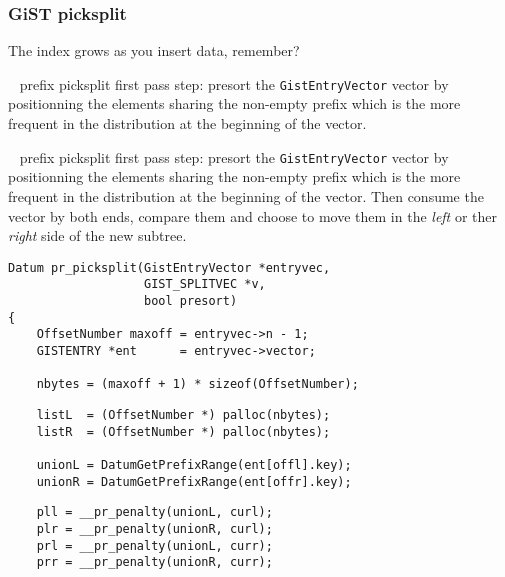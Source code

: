 \documentclass{beamer}
\begin{document}
\begin{frame}[fragile]
  \frametitle{GiST picksplit}

  The index grows as you insert data, remember?

  \begin{overprint}

  ~
  \linebreak
  prefix picksplit first pass step: presort the \texttt{GistEntryVector}
  vector by positionning the elements sharing the non-empty prefix which is
  the more frequent in the distribution at the beginning of the vector.
  \linebreak
  \linebreak

  ~
  \linebreak
  prefix picksplit first pass step: presort the \texttt{GistEntryVector}
  vector by positionning the elements sharing the non-empty prefix which is
  the more frequent in the distribution at the beginning of the vector.
  \linebreak
  \linebreak
  Then consume the vector by both ends, compare them and choose to move them
  in the \textit{left} or ther \textit{right} side of the new subtree.

  \begin{example}
  \begin{verbatim}
Datum pr_picksplit(GistEntryVector *entryvec,
                   GIST_SPLITVEC *v,
                   bool presort)
{
    OffsetNumber maxoff = entryvec->n - 1;
    GISTENTRY *ent      = entryvec->vector;

    nbytes = (maxoff + 1) * sizeof(OffsetNumber);
  \end{verbatim}
  \end{example}

  \begin{example}
  \begin{verbatim}
    listL  = (OffsetNumber *) palloc(nbytes);
    listR  = (OffsetNumber *) palloc(nbytes);

    unionL = DatumGetPrefixRange(ent[offl].key);
    unionR = DatumGetPrefixRange(ent[offr].key);
  \end{verbatim}
  \end{example}

  \begin{example}
  \begin{verbatim}
    pll = __pr_penalty(unionL, curl);
    plr = __pr_penalty(unionR, curl);
    prl = __pr_penalty(unionL, curr);
    prr = __pr_penalty(unionR, curr);
  \end{verbatim}
  \end{example}


\end{overprint}
\end{frame}
\end{document}
